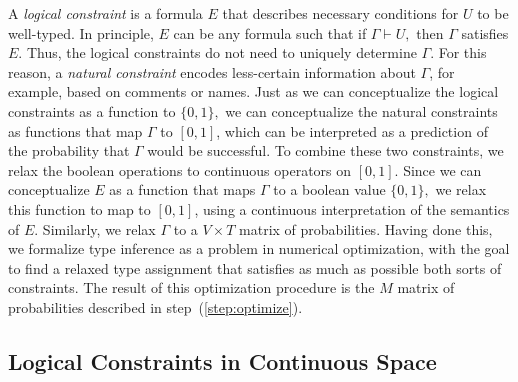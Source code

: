 \documentclass[sigplan,10pt,anonymous]{acmart} %
\theoremstyle{plain}
\theoremstyle{remark}
\theoremstyle{definition}
\begin{document}
A \emph{logical constraint} is a formula $E$ that describes
necessary conditions for $U$ to be well-typed.
In principle, $E$ can be any formula such that if $\Gamma \vdash U,$
then $\Gamma$ satisfies $E$.
Thus, the logical constraints
do not need to uniquely determine $\Gamma$.
For this reason, a \emph{natural constraint}
encodes less-certain information about $\Gamma$,
for example, based on comments or names.
Just as we can conceptualize the logical
constraints as a function to $\{0, 1\},$
we can conceptualize the natural constraints as functions
that map $\Gamma$ to $[0, 1]$, which can be interpreted
as a prediction of the probability that $\Gamma$ would
be successful. To combine these two constraints, we relax the boolean operations to continuous operators on $[0, 1]$.
Since we can conceptualize $E$ as a function
that maps $\Gamma$ to a boolean value $\{0, 1\},$
we relax this function to map to $[0,1]$, using
a continuous interpretation of the semantics of $E.$
Similarly, we relax $\Gamma$ to a $V \times T$ matrix of probabilities.
Having done this,
we formalize type inference as a problem in
numerical optimization, with the goal to find a relaxed type assignment
that satisfies as much as possible both sorts of constraints.
The result of this optimization procedure is the
$M$ matrix of probabilities described in step~(\ref{step:optimize}).

\subsection{Logical Constraints in Continuous Space}\label{ssec:logcon}
\end{document}
